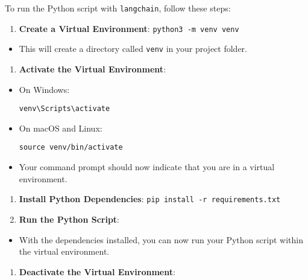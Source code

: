 To run the Python script with \texttt{langchain}, follow these steps:

\begin{enumerate}
\def\labelenumi{\arabic{enumi}.}
\tightlist
\item
  \textbf{Create a Virtual Environment}:
  \texttt{python3\ -m\ venv\ venv}
\end{enumerate}

\begin{itemize}
\tightlist
\item
  This will create a directory called \texttt{venv} in your project
  folder.
\end{itemize}

\begin{enumerate}
\def\labelenumi{\arabic{enumi}.}
\setcounter{enumi}{1}
\tightlist
\item
  \textbf{Activate the Virtual Environment}:
\end{enumerate}

\begin{itemize}
\item
  On Windows:

\begin{verbatim}
venv\Scripts\activate
\end{verbatim}
\item
  On macOS and Linux:

\begin{verbatim}
source venv/bin/activate
\end{verbatim}
\item
  Your command prompt should now indicate that you are in a virtual
  environment.
\end{itemize}

\begin{enumerate}
\def\labelenumi{\arabic{enumi}.}
\setcounter{enumi}{2}
\item
  \textbf{Install Python Dependencies}:
  \texttt{pip\ install\ -r\ requirements.txt}
\item
  \textbf{Run the Python Script}:
\end{enumerate}

\begin{itemize}
\tightlist
\item
  With the dependencies installed, you can now run your Python script
  within the virtual environment.
\end{itemize}

\begin{enumerate}
\def\labelenumi{\arabic{enumi}.}
\setcounter{enumi}{4}
\tightlist
\item
  \textbf{Deactivate the Virtual Environment}:
\end{enumerate}

